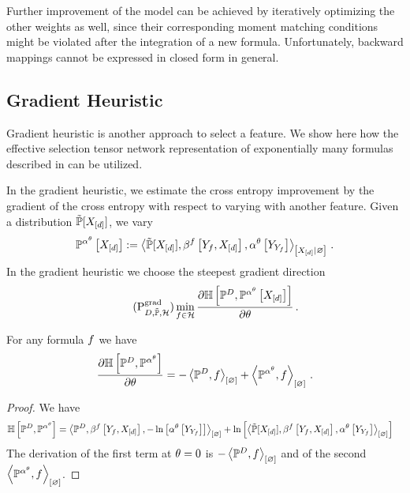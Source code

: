 Further improvement of the model can be achieved by iteratively optimizing the other weights as well, since their corresponding moment matching conditions might be violated after the integration of a new formula.
Unfortunately, backward mappings cannot be expressed in closed form in general.



\subsection{Gradient Heuristic}

Gradient heuristic is another approach to select a feature.
We show here how the effective selection tensor network representation of exponentially many formulas described in  can be utilized. %

In the gradient heuristic, we estimate the cross entropy improvement by the gradient of the cross entropy with respect to varying with another feature.
Given a distribution $\tilde{\mathbb{P}}[X_{[d]}]$, we vary %
\begin{align*}
    \probofat{\softacttensor}{\shortcatvariables}
    \coloneqq \normalizationof{\secprobwith,\formulaccwith,\softacttensorat{\headvariableof{\formulavar}}}{\shortcatvariables} \, .
\end{align*}
In the gradient heuristic we choose the steepest gradient direction
\begin{align}
    \label{prob:greedyGrad}\tag{$\probtagtypeinst{\gradientsymbol}{\datamap,\secprobtensor,\greedyhypothesis}$}
    \min_{\formula\in\greedyhypothesis} \difofwrt{\centropyof{\empdistribution}{\probofat{\softacttensor}{\shortcatvariables}}}{\canparam}   \, .
\end{align}

\begin{lemma}
    For any formula $f$ we have
    \begin{align*}
        \frac{\partial \mathbb{H}\left[\mathbb{P}^{D},\mathbb{P}^{\alpha^\theta}\right]}{\partial \theta} =
        -\left\langle \mathbb{P}^{D},f\right\rangle_{\left[ \varnothing \right]} + \left\langle \mathbb{P}^{\alpha^\theta},f\right\rangle_{\left[ \varnothing \right]} \, .
    \end{align*}
\end{lemma}
\begin{proof}
    We have
    \begin{align*}
        \centropyof{\empdistribution}{\probof{\softacttensor}}
        & = \contraction{\empdistribution,\formulaccwith,-\lnof{\softacttensorat{\headvariableof{\formulavar}}}}
        + \lnof{\contraction{\secprobwith,\formulaccwith,\softacttensorat{\headvariableof{\formulavar}}}}
    \end{align*}
    The derivation of the first term at $\theta=0$ is $-\left\langle \mathbb{P}^{D},f\right\rangle_{\left[ \varnothing \right]}$ and of the second $\left\langle \mathbb{P}^{\alpha^\theta},f\right\rangle_{\left[ \varnothing \right]}$.
\end{proof}

